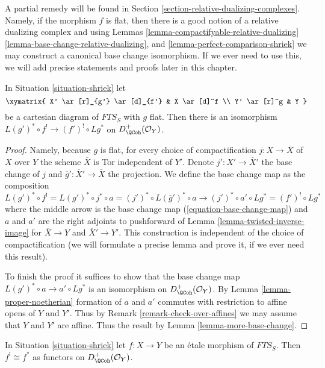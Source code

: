 \medskip\noindent
A partial remedy will be found in
Section \ref{section-relative-dualizing-complexes}.
Namely, if the morphism $f$ is flat, then there is a good
notion of a relative dualizing complex and using
Lemmas \ref{lemma-compactifyable-relative-dualizing}
\ref{lemma-base-change-relative-dualizing},
and \ref{lemma-perfect-comparison-shriek}
we may construct a canonical base change isomorphism.
If we ever need to use this, we will add precise statements and
proofs later in this chapter.

\begin{lemma}
\label{lemma-base-change-shriek-flat}
In Situation \ref{situation-shriek} let
$$
\xymatrix{
X' \ar[r]_{g'} \ar[d]_{f'} & X \ar[d]^f \\
Y' \ar[r]^g & Y
}
$$
be a cartesian diagram of $\textit{FTS}_S$ with $g$ flat.
Then there is an isomorphism
$L(g')^* \circ f^! \to (f')^! \circ Lg^*$ on
$D_\QCoh^+(\mathcal{O}_Y)$.
\end{lemma}

\begin{proof}
Namely, because $g$ is flat, for every choice of
compactification $j : X \to \overline{X}$ of $X$ over $Y$
the scheme $\overline{X}$ is Tor independent of $Y'$.
Denote $j' : X' \to \overline{X}'$ the
base change of $j$ and $\overline{g}' : \overline{X}' \to \overline{X}$
the projection. We define the base change map as the composition
$$
L(g')^* \circ f^! = L(g')^* \circ j^* \circ a =
(j')^* \circ L(\overline{g}')^* \circ a \longrightarrow
(j')^* \circ a' \circ Lg^* = (f')^! \circ Lg^*
$$
where the middle arrow is the base change map
(\ref{equation-base-change-map})
and $a$ and $a'$ are the right adjoints to pushforward
of Lemma \ref{lemma-twisted-inverse-image}
for $\overline{X} \to Y$ and $\overline{X}' \to Y'$.
This construction is independent of the choice of
compactification (we will formulate a precise lemma
and prove it, if we ever need this result).

\medskip\noindent
To finish the proof it suffices to show that the base change
map $L(g')^* \circ a \to a' \circ Lg^*$ is an isomorphism
on $D_\QCoh^+(\mathcal{O}_Y)$.
By Lemma \ref{lemma-proper-noetherian} formation of $a$ and $a'$
commutes with restriction to affine opens of $Y$ and $Y'$.
Thus by Remark \ref{remark-check-over-affines}
we may assume that $Y$ and $Y'$ are affine.
Thus the result by Lemma \ref{lemma-more-base-change}.
\end{proof}

\begin{lemma}
\label{lemma-shriek-etale}
In Situation \ref{situation-shriek} let $f : X \to Y$ be an \'etale
morphism of $\textit{FTS}_S$. Then $f^! \cong f^*$ as functors on
$D^+_\QCoh(\mathcal{O}_Y)$.
\end{lemma}

